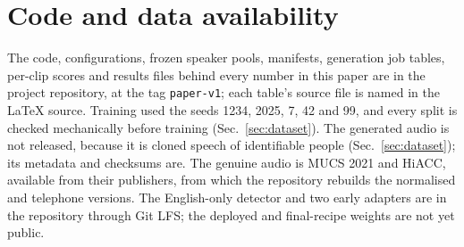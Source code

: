 \documentclass[conference]{IEEEtran}
\begin{document}
\section*{Code and data availability}
The code, configurations, frozen speaker pools, manifests, generation job tables, per-clip
scores and results files behind every number in this paper are in the project repository,
at the tag \texttt{paper-v1}; each table's source file is named in the LaTeX source. Training used the
seeds 1234, 2025, 7, 42 and 99, and every split is checked mechanically before training
(Sec.~\ref{sec:dataset}). The generated audio is not released, because it is cloned speech
of identifiable people (Sec.~\ref{sec:dataset}); its metadata and checksums are. The
genuine audio is MUCS 2021 and HiACC, available from their publishers, from which the
repository rebuilds the normalised and telephone versions. The English-only detector and two early adapters
are in the repository through Git LFS; the deployed and final-recipe weights are not yet
public.



\end{document}
